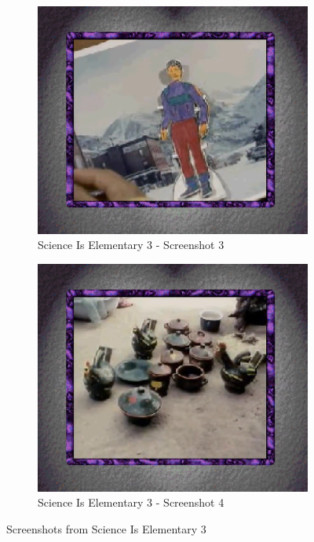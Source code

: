 \begin{figure}[H]
    \begin{subfigure}{0.45\textwidth}
        \centering
        \includegraphics[width=\linewidth]{Games/ScienceIsElementary/Images/ScienceIsElementary3Image3.png}
        \caption{Science Is Elementary 3 - Screenshot 3}
    \end{subfigure}
    \begin{subfigure}{0.45\textwidth}
        \centering
        \includegraphics[width=\linewidth]{Games/ScienceIsElementary/Images/ScienceIsElementary3Image4.png}
        \caption{Science Is Elementary 3 - Screenshot 4}
    \end{subfigure}
    \caption{Screenshots from Science Is Elementary 3}
\end{figure}